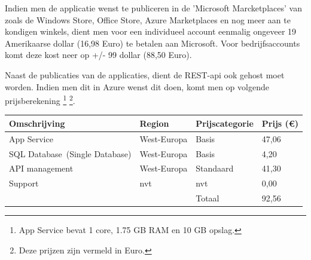 Indien men de applicatie wenst te publiceren in de 'Microsoft Marcketplaces' van \cite{registerasanappdeveloper2017}
 zoals de Windows Store, Office Store, Azure Marketplaces en nog meer aan te kondigen winkels, dient men voor een individueel account
 eenmalig ongeveer 19 Amerikaarse dollar (16,98 Euro) te betalen aan Microsoft. Voor bedrijfsaccounts komt deze kost neer op +/- 99 dollar (88,50 Euro).

Naast de publicaties van de applicaties, dient de REST-api ook gehost moet worden. Indien men dit in Azure wenst dit doen, komt men op volgende prijsberekening \footnote{App Service bevat 1 core, 1.75 GB RAM en 10 GB opslag.} \footnote{Deze prijzen zijn vermeld in Euro.}.

\begin{flushleft}
  \newline
  \begin{tabular}{ | l | l | l | l |}
  \hline
  Omschrijving & Region & Prijscategorie & Prijs (€)
  \\ \hline
  App Service & West-Europa & Basis & 47,06
  \\ \hline
  SQL Database (Single Database) & West-Europa & Basis & 4,20
  \\ \hline
  API management & West-Europa & Standaard & 41,30
  \\ \hline
  Support & nvt & nvt & 0,00
  \\ \hline
   & & Totaal & 92,56
  \\ \hline
  \end{tabular}
\end{flushleft}
